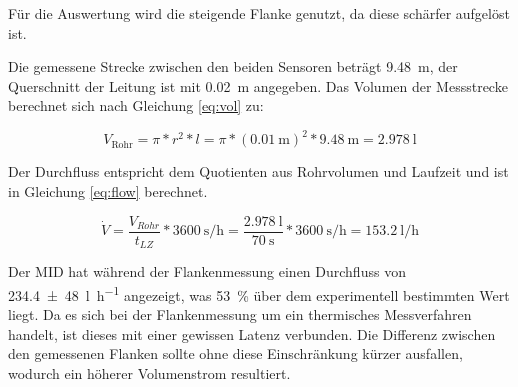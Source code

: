 Für die Auswertung wird die steigende Flanke genutzt, da diese schärfer aufgelöst ist.

Die gemessene Strecke zwischen den beiden Sensoren beträgt \SI{9,48}{\meter}, der Querschnitt der Leitung ist mit \SI{0,02}{\meter} angegeben. Das Volumen der Messstrecke berechnet sich nach Gleichung \ref{eq:vol} zu:

\begin{equation}
	\label{eq:vol}
	V_{\text{Rohr}} = \pi * r^2 * l = \pi * (\SI{0,01}{\meter})^2 * \SI{9,48}{\meter} = \SI{2,978}{\litre}
\end{equation}

Der Durchfluss entspricht dem Quotienten aus Rohrvolumen und Laufzeit und ist in Gleichung \ref{eq:flow} berechnet.

\begin{equation}
	\label{eq:flow}
	\dot V = \frac{V_{Rohr}}{t_{LZ}}*\SI{3600}{\second\per\hour} = \frac{\SI{2,978}{\litre}}{\SI{70}{\second}}*\SI{3600}{\second\per\hour} = \SI{153,2}{\litre\per\hour}
\end{equation}

Der MID hat während der Flankenmessung einen Durchfluss von \SI{234,4(48)}{\litre\per\hour} angezeigt, was \SI{53}{\percent} über dem experimentell bestimmten Wert liegt. Da es sich bei der Flankenmessung um ein thermisches Messverfahren handelt, ist dieses mit einer gewissen Latenz verbunden. Die Differenz zwischen den gemessenen Flanken sollte ohne diese Einschränkung kürzer ausfallen, wodurch ein höherer Volumenstrom resultiert.


